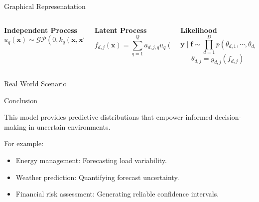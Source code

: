 \documentclass[spanish]{beamer}
\begin{document}
\begin{frame}{Graphical Represenatation}
\begin{tikzpicture}[x=4.2cm,y=1.7cm]
\end{tikzpicture}
\scriptsize
\begin{columns}[T] %
	\begin{column}{0.33\textwidth}
		\centering	
		\textcolor{mygreen}{
			\textbf{Independent Process}
			\vspace{-1.3em}
			\begin{equation*}
				u_{q}(\mathbf{x}) \sim \mathcal{GP}(0, k_{q}(\mathbf{x}, \mathbf{x}'))
			\end{equation*}
		}
	\end{column}
	
	\begin{column}{0.33\textwidth}
		\centering
		\textcolor{myblue}{
			\textbf{Latent Process}
			\vspace{-1.3em}
			\begin{equation*}
				f_{d,j}(\mathbf{x}) = \sum_{q=1}^Q a_{d,j,q} u_{q}(\mathbf{x})
			\end{equation*}
		}
	\end{column}
	
	\begin{column}{0.33\textwidth}
		\centering
		\textcolor{myred}{
			\textbf{Likelihood}
			\vspace{-1.3em}
			\begin{equation*}
				\mathbf{y} \mid \mathbf{f} \sim \prod_{d=1}^D p(\theta_{d, 1}, \cdots, \theta_{d, J_d})
			\end{equation*}
			\vspace{-1.5em}
			\begin{equation*}
				\theta_{d, j} = g_{d, j}(f_{d, j})
			\end{equation*}
		}
	\end{column}
	
\end{columns}
\end{frame}

\begin{frame}{Real World Scenario}
	\centering
	
\end{frame}

\begin{frame}{Conclusion}
	\begin{block}{}
	This model provides predictive distributions that empower informed decision-making in uncertain environments.
	
	For example:
	\begin{itemize}[<+->]
		\item Energy management: Forecasting load variability.
		\item Weather prediction: Quantifying forecast uncertainty.
		\item Financial risk assessment: Generating reliable confidence intervals.
	\end{itemize}
	\end{block}
\end{frame}
\end{document}

